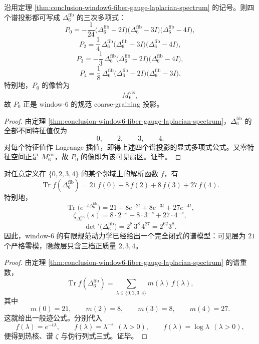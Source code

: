 \begin{corollary}\label{cor:conclusion-window6-fiber-gauge-laplacian-projectors}
沿用定理 \ref{thm:conclusion-window6-fiber-gauge-laplacian-spectrum} 的记号。则四个谱投影都可写成 \(\Delta_6^{\mathrm{fib}}\) 的三次多项式：
\[
P_0=-\frac1{24}\bigl(\Delta_6^{\mathrm{fib}}-2I\bigr)\bigl(\Delta_6^{\mathrm{fib}}-3I\bigr)\bigl(\Delta_6^{\mathrm{fib}}-4I\bigr),
\]
\[
P_2=\frac14\,\Delta_6^{\mathrm{fib}}\bigl(\Delta_6^{\mathrm{fib}}-3I\bigr)\bigl(\Delta_6^{\mathrm{fib}}-4I\bigr),
\]
\[
P_3=-\frac13\,\Delta_6^{\mathrm{fib}}\bigl(\Delta_6^{\mathrm{fib}}-2I\bigr)\bigl(\Delta_6^{\mathrm{fib}}-4I\bigr),
\]
\[
P_4=\frac18\,\Delta_6^{\mathrm{fib}}\bigl(\Delta_6^{\mathrm{fib}}-2I\bigr)\bigl(\Delta_6^{\mathrm{fib}}-3I\bigr).
\]
特别地，\(P_0\) 的像恰为
\[
M_6^{\mathrm{vis}},
\]
故 \(P_0\) 正是 window-\(6\) 的规范 coarse-graining 投影。
\end{corollary}
\begin{proof}
由定理 \ref{thm:conclusion-window6-fiber-gauge-laplacian-spectrum}，\(\Delta_6^{\mathrm{fib}}\) 的全部不同特征值仅为
\[
0,\qquad 2,\qquad 3,\qquad 4.
\]
对每个特征值作 Lagrange 插值，即得上述四个谱投影的显式多项式公式。又零特征空间正是 \(M_6^{\mathrm{vis}}\)，故 \(P_0\) 的像即为该可见扇区。证毕。
\end{proof}

\begin{corollary}\label{cor:conclusion-window6-fiber-gauge-laplacian-spectral-functions}
对任意定义在 \(\{0,2,3,4\}\) 的某个邻域上的解析函数 \(f\)，有
\[
\operatorname{Tr}f(\Delta_6^{\mathrm{fib}})
=
21\,f(0)+8\,f(2)+8\,f(3)+27\,f(4).
\]
特别地，
\[
\operatorname{Tr}\!\bigl(e^{-t\Delta_6^{\mathrm{fib}}}\bigr)
=
21+8e^{-2t}+8e^{-3t}+27e^{-4t},
\]
\[
\zeta_{\Delta_6^{\mathrm{fib}}}(s)
=
8\cdot 2^{-s}+8\cdot 3^{-s}+27\cdot 4^{-s},
\]
\[
\det\nolimits'\!\bigl(\Delta_6^{\mathrm{fib}}\bigr)
=
2^8\,3^8\,4^{27}
=
2^{62}3^8.
\]
因此，window-\(6\) 的有限规范动力学已经给出一个完全闭式的谱模型：可见层为 \(21\) 个严格零模，隐藏层只含三档正质量 \(2,3,4\)。
\end{corollary}
\begin{proof}
由定理 \ref{thm:conclusion-window6-fiber-gauge-laplacian-spectrum} 的谱重数，
\[
\operatorname{Tr}f(\Delta_6^{\mathrm{fib}})
=
\sum_{\lambda\in\{0,2,3,4\}}m(\lambda)\,f(\lambda),
\]
其中
\[
m(0)=21,\qquad m(2)=8,\qquad m(3)=8,\qquad m(4)=27.
\]
这就给出一般迹公式。分别代入
\[
f(\lambda)=e^{-t\lambda},
\qquad
f(\lambda)=\lambda^{-s}\ \ (\lambda>0),
\qquad
f(\lambda)=\log\lambda\ \ (\lambda>0),
\]
便得到热核、谱 \(\zeta\) 与伪行列式三式。证毕。
\end{proof}

